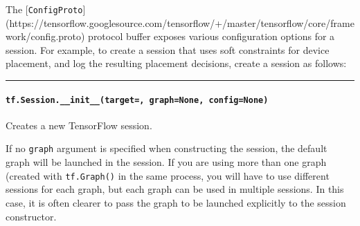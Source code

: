 \begin{Shaded}
\begin{Highlighting}[]
\OperatorTok{=} 

  
\end{Highlighting}
\end{Shaded}

The {[}\texttt{ConfigProto}{]}
(https://tensorflow.googlesource.com/tensorflow/+/master/tensorflow/core/framework/config.proto)
protocol buffer exposes various configuration options for a session. For
example, to create a session that uses soft constraints for device
placement, and log the resulting placement decisions, create a session
as follows:

\begin{Shaded}
\begin{Highlighting}[]
\OperatorTok{=} \OperatorTok{=}\OperatorTok{=}\NormalTok{,}
                                        \OperatorTok{=}\NormalTok{))}
\end{Highlighting}
\end{Shaded}

\begin{center}\rule{0.5\linewidth}{\linethickness}\end{center}

\paragraph{\texorpdfstring{\texttt{tf.Session.\_\_init\_\_(target=\textquotesingle{}\textquotesingle{},\ graph=None,\ config=None)}
}{tf.Session.\_\_init\_\_(target='', graph=None, config=None) }}\label{tf.session.ux5fux5finitux5fux5ftarget-graphnone-confignone}

Creates a new TensorFlow session.

If no \texttt{graph} argument is specified when constructing the
session, the default graph will be launched in the session. If you are
using more than one graph (created with \texttt{tf.Graph()} in the same
process, you will have to use different sessions for each graph, but
each graph can be used in multiple sessions. In this case, it is often
clearer to pass the graph to be launched explicitly to the session
constructor.

